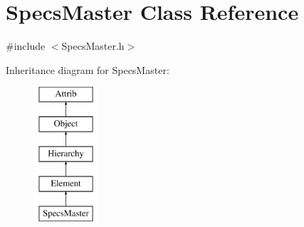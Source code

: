 \hypertarget{classSpecsMaster}{}\section{Specs\+Master Class Reference}
\label{classSpecsMaster}


{\ttfamily \#include $<$Specs\+Master.\+h$>$}

Inheritance diagram for Specs\+Master\+:\begin{figure}[H]
\begin{center}
\leavevmode
\includegraphics[height=5.000000cm]{classSpecsMaster}
\end{center}
\end{figure}
